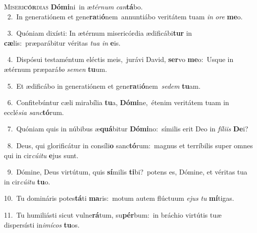 \lettrine{\initial\textcolor{\initialcolor}{M}}{iseri\-\textbf{cór}\-dias} \textbf{Dó}\-\textbf{mi}ni~\star in æ\-\textit{tér}\-\textit{num} \textit{can}\-\textbf{tá}bo.\\
{\numbfont\textcolor{\numbcolor}{~2.}}~In generatiónem et gene\-\textbf{ra}\-ti\-\textbf{ó}\-nem~\star annuntiábo veritátem tuam \textit{in} \textit{o}\-\textit{re} \textbf{me}\-o.\par
{\numbfont\textcolor{\numbcolor}{~3.}}~Quóniam dixísti: In ætérnum misericórdia ædificábi\textbf{tur} in \textbf{cæ}\-lis:~\star præparábitur véritas \textit{tu}\-\textit{a} \textit{in} \textbf{e}\-is.\par
{\numbfont\textcolor{\numbcolor}{~4.}}~Dispósui testaméntum eléctis meis,~\dagger jurávi David, \textbf{ser}\-vo \textbf{me}\-o:~\star Usque in ætérnum præpará\textit{bo} \textit{se}\-\textit{men} \textbf{tu}\-um.\par
{\numbfont\textcolor{\numbcolor}{~5.}}~Et ædificábo in generatiónem et gene\-\textbf{ra}\-ti\-\textbf{ó}\-nem~\star \textit{se}\-\textit{dem} \textbf{tu}\-am.\par
{\numbfont\textcolor{\numbcolor}{~6.}}~Confitebúntur cæli mirabília \textbf{tu}\-a, \textbf{Dó}\-\textbf{mi}ne,~\star étenim veritátem tuam in ecclé\-\textit{si}\-\textit{a} \textit{sanc}\-\textbf{tó}rum.\par
{\numbfont\textcolor{\numbcolor}{~7.}}~Quóniam quis in núbibus æ\-\textbf{quá}\-bitur \textbf{Dó}\-\textbf{mi}no:~\star símilis erit Deo in \textit{fí}\-\textit{li}\textit{is} \textbf{De}\-i?\par
{\numbfont\textcolor{\numbcolor}{~8.}}~Deus, qui glorificátur in consíli\textbf{o} sanc\-\textbf{tó}\-rum:~\star magnus et terríbilis super omnes qui in cir\-\textit{cú}\-\textit{i}\textit{tu} \textbf{e}\-jus sunt.\par
{\numbfont\textcolor{\numbcolor}{~9.}}~Dómine, Deus virtútum, quis \textbf{sí}\-milis \textbf{ti}\-bi?~\star potens es, Dómine, et véritas tua in cir\-\textit{cú}\-\textit{i}\textit{tu} \textbf{tu}\-o.\par
{\numbfont\textcolor{\numbcolor}{10.}}~Tu domináris potes\-\textbf{tá}\-ti \textbf{ma}\-ris:~\star motum autem flúctuum \textit{e}\-\textit{jus} \textit{tu} \textbf{mí}\-tigas.\par
{\numbfont\textcolor{\numbcolor}{11.}}~Tu humiliásti sicut vulne\-\textbf{rá}\-tum, su\-\textbf{pér}\-bum:~\star in bráchio virtútis tuæ dispersísti in\-\textit{i}\-\textit{mí}\textit{cos} \textbf{tu}\-os.\par
